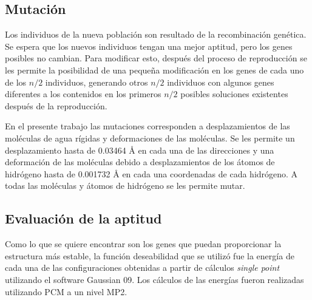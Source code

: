 \subsection{Mutaci\'on}
Los individuos de la nueva poblaci\'on son resultado de la 
recombinaci\'on gen\'etica. Se espera que los nuevos individuos 
tengan una mejor aptitud, pero los genes posibles no cambian. Para 
modificar esto, despu\'es del proceso de reproducci\'on se les 
permite la posibilidad de una peque\~na modificaci\'on en los genes
de cada uno de los $n/2$ individuos, generando otros $n/2$ individuos
con algunos genes diferentes a los contenidos en los primeros $n/2$
posibles soluciones existentes despu\'es de la reproducci\'on.

En el presente trabajo las mutaciones corresponden a desplazamientos 
de las mol\'eculas de agua r\'igidas y deformaciones de las 
mol\'eculas. Se les permite un desplazamiento hasta de 0.03464 {\AA} 
en cada una de las direcciones y una deformaci\'on de las mol\'eculas
debido a desplazamientos de los \'atomos de hidr\'ogeno hasta de
0.001732 {\AA} en cada una coordenadas de cada hidr\'ogeno. A todas 
las mol\'eculas y \'atomos de hidr\'ogeno se les permite mutar.

\subsection{Evaluaci\'on de la aptitud}
Como lo que se quiere encontrar son los genes que puedan proporcionar
la estructura m\'as estable, la funci\'on deseabilidad que se 
utiliz\'o fue la energ\'ia de cada una de las configuraciones 
obtenidas a partir de c\'alculos {\it single point} utilizando el
software Gaussian 09. Los c\'alculos de las energ\'ias fueron 
realizadas utilizando PCM a un nivel MP2. 

